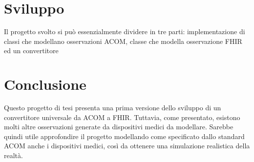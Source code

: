 \documentclass[a4paper]{article}
\begin{document}
\section{Sviluppo}
Il progetto svolto si può essenzialmente dividere in tre parti: implementazione di classi che modellano osservazioni ACOM,
classe che modella osservazione FHIR ed un convertitore 
\section{Conclusione}
Questo progetto di tesi presenta una prima versione dello sviluppo di un convertitore universale da ACOM a FHIR.
Tuttavia, come presentato, esistono molti altre osservazioni generate da dispositivi medici da modellare.
Sarebbe quindi utile approfondire il progetto modellando come specificato dallo standard ACOM anche i dispositivi medici,
così da ottenere una simulazione realistica della realtà.
\printbibliography
\end{document}
